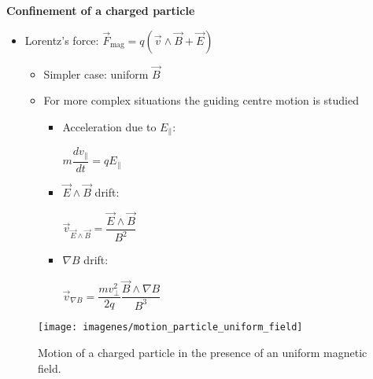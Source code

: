 \documentclass[10pt]{beamer}
\begin{document}
\begin{frame}{\bf Confinement of a charged particle}

\begin{minipage}{0.55\textwidth}

\begin{itemize}

\item Lorentz's force: $\vec{F}_\text{mag}=q( \vec{v} \wedge \vec{B} +\vec{E})$

\begin{itemize}

\item Simpler case: uniform  $\vec{B}$

\item For more complex situations the guiding centre motion is studied

\begin{itemize}

\item Acceleration due to $E_{\parallel}$:

$m \dfrac{d v_{\parallel}}{dt}=q E_{\parallel}$

\item $\vec{E} \wedge \vec{B}$ drift:

$\vec{v}_{\vec{E} \wedge \vec{B}}=\dfrac{\vec{E} \wedge \vec{B}}{B^2}$

\item $\nabla B$ drift:

$\vec{v}_{\nabla B}=\dfrac{m v_{\perp}^2}{2q} \dfrac{\vec{B} \wedge \nabla B}{B^3}$

\end{itemize}

\end{itemize}
\end{itemize}
\end{minipage}
%
\hfill
%
\begin{minipage}{0.4\textwidth}
\begin{figure}[htbp]
\texttt{[image: imagenes/motion\_particle\_uniform\_field]}
\caption{Motion of a charged particle in the presence of an uniform magnetic field.}
\end{figure}
\end{minipage}

\end{frame}
\end{document}
